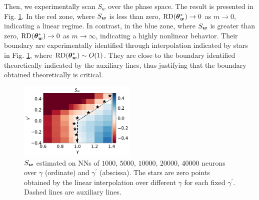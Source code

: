 \documentclass{article}
\begin{document}
Then, we experimentally scan $S_w$ over the phase space. The result is presented in Fig. \ref{fig:wds}. In the red zone, where $S_{\bm{w}}$ is less than zero, $\mathrm{RD}(\bm{\theta}^*_{\bm{w}})\to0$ as $m\to0$, indicating a linear regime. In contrast, in the blue zone, where $S_{\bm{w}}$ is greater than zero, $\mathrm{RD}(\bm{\theta}^*_{\bm{w}})\to0$ as $m\to\infty$, indicating a highly nonlinear behavior. Their boundary are experimentally identified through interpolation indicated by stars in Fig. \ref{fig:wds}, where $\mathrm{RD}(\bm{\theta}^*_{\bm{w}})\sim O(1)$. They are close to the boundary identified theoretically indicated by the auxiliary lines, thus justifying that the boundary obtained theoretically is critical.

\begin{figure}
    \centering
    \includegraphics[width=0.5\textwidth]{pic/systemexplarg3/scalestudy3/rescale_w_slope.pdf}
    \caption{$S_{\bm{w}}$ estimated on NNs of $1000$, $5000$, $10000$, $20000$, $40000$ neurons over $\gamma$ (ordinate) and $\gamma^{\prime}$ (abscissa). The stars are zero points obtained by the linear interpolation over different $\gamma$ for each fixed $\gamma^{\prime}$. Dashed lines are auxiliary lines.}
    \label{fig:wds} 
\end{figure}
\end{document}

